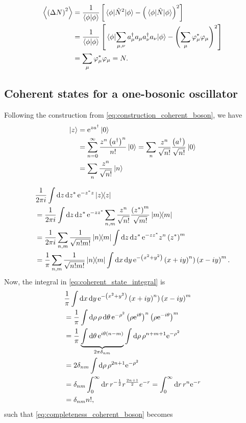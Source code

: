 \begin{align}
\ev{\left(\Delta N \right)^2} &= \frac{1}{\braket{\phi}}\left[ \ev{\hat{N}^2}{\phi} - \left( \ev{\hat{N}}{\phi}\right)^2\right] \\
&= \frac{1}{\braket{\phi}}\left[\ev{\sum_{\mu, \nu}a_\mu^\dagger a_\mu a_\nu^\dagger a_\nu}{\phi} - \left(\sum_\mu\varphi_\mu^*\varphi_\mu\right)^2\right]\\
\label{unc:expvalN2}
&= \sum_\mu\varphi_\mu^*\varphi_\mu = N.
\end{align}

\subsection{Coherent states for a one-bosonic oscillator}

Following the construction from \eqref{eq:construction_coherent_boson}, we have
\begin{align}
\ket{z} &= \mathrm{e}^{za^\dagger}\ket 0 \\
&= \sum_{n=0}^\infty \frac{z^n\left(a^\dagger\right)^n}{n!}\ket{0} = \sum_n \frac{z^n}{\sqrt{n!}}\frac{\left(a^\dagger\right)}{\sqrt{n!}}\ket 0 \\
&= \sum_n\frac{z^n}{\sqrt{n!}}\ket n
\end{align}

\begin{align}
\label{eq:completeness_coherent_boson}
&\frac{1}{2\pi i}\int\dd z \dd{z^*}\e^{-z^*z}\dyad z \\
&= \frac{1}{2\pi i}\int \dd z \dd{z^*}\e^{-zz^*}\sum_{n,m}\frac{z^n}{\sqrt{n!}}\frac{\left(z^*\right)^m}{\sqrt{m!}}\dyad m \\
&= \frac{1}{2\pi i}\sum_{n, m}\frac{1}{\sqrt{n!m!}}\dyad{n}{m}\int\dd z \dd{z^*}\e^{-zz^*}z^n\left(z^*\right)^m \\
&= \frac{1}{\pi}\sum_{n, m}\frac{1}{\sqrt{n!m!}}\dyad{n}{m}\int \dd{x}\dd{y} \e^{-\left(x^2 + y^2\right)}\left(x+iy\right)^n)\left(x-iy\right)^m. \label{eq:coherent_state_integral}
\end{align}
Now, the integral in \eqref{eq:coherent_state_integral} is
\begin{align}
&\frac{1}{\pi}\int\dd{x}\dd{y}\mathrm{e}^{-\left(x^2 + y^2\right)}\left(x+iy\right)^n)\left(x-iy\right)^m \nonumber \\
&= \frac{1}{\pi} \int \dd{\rho}\rho\dd{\theta}\mathrm{e}^{-\rho^2}\left(\rho\mathrm{e}^{i\theta}\right)^n\left(\rho\mathrm{e}^{-i\theta}\right)^m\nonumber \\
&= \frac{1}{\pi}\underbrace{\int\dd{\theta}\mathrm{e}^{i\theta(n-m)}}_{2\pi\delta_{nm}}\int\dd{\rho}\rho^{n+m+1}\mathrm{e}^{-\rho^2}\nonumber \\
&= 2\delta_{nm}\int\dd{\rho}\rho^{2n+1}\mathrm{e}^{-\rho^2}\nonumber\\ 
&= \delta_{nm}\int_0^\infty\dd{r}r^{-\frac{1}{2}}r^{\frac{2n+1}{2}}e^{-r} = \int_0^\infty\dd{r}r^n\mathrm{e}^{-r} \nonumber\\
&= \delta_{nm}n!,
\end{align}
such that \eqref{eq:completeness_coherent_boson} becomes

